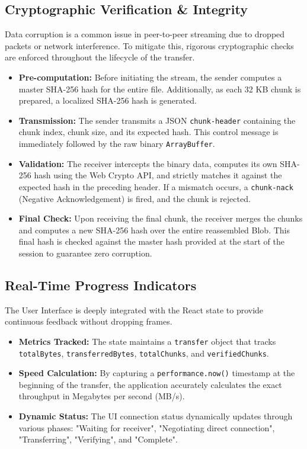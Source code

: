 \documentclass[12pt, a4paper]{article}
\begin{document}
\subsection{Cryptographic Verification \& Integrity}
Data corruption is a common issue in peer-to-peer streaming due to dropped packets or network interference. To mitigate this, rigorous cryptographic checks are enforced throughout the lifecycle of the transfer.
\begin{itemize}
    \item \textbf{Pre-computation:} Before initiating the stream, the sender computes a master SHA-256 hash for the entire file. Additionally, as each 32 KB chunk is prepared, a localized SHA-256 hash is generated.
    \item \textbf{Transmission:} The sender transmits a JSON \texttt{chunk-header} containing the chunk index, chunk size, and its expected hash. This control message is immediately followed by the raw binary \texttt{ArrayBuffer}.
    \item \textbf{Validation:} The receiver intercepts the binary data, computes its own SHA-256 hash using the Web Crypto API, and strictly matches it against the expected hash in the preceding header. If a mismatch occurs, a \texttt{chunk-nack} (Negative Acknowledgement) is fired, and the chunk is rejected.
    \item \textbf{Final Check:} Upon receiving the final chunk, the receiver merges the chunks and computes a new SHA-256 hash over the entire reassembled Blob. This final hash is checked against the master hash provided at the start of the session to guarantee zero corruption.
\end{itemize}

\subsection{Real-Time Progress Indicators}
The User Interface is deeply integrated with the React state to provide continuous feedback without dropping frames.
\begin{itemize}
    \item \textbf{Metrics Tracked:} The state maintains a \texttt{transfer} object that tracks \texttt{totalBytes}, \texttt{transferredBytes}, \texttt{totalChunks}, and \texttt{verifiedChunks}.
    \item \textbf{Speed Calculation:} By capturing a \texttt{performance.now()} timestamp at the beginning of the transfer, the application accurately calculates the exact throughput in Megabytes per second (MB/s).
    \item \textbf{Dynamic Status:} The UI connection status dynamically updates through various phases: "Waiting for receiver", "Negotiating direct connection", "Transferring", "Verifying", and "Complete".
\end{itemize}
\end{document}
